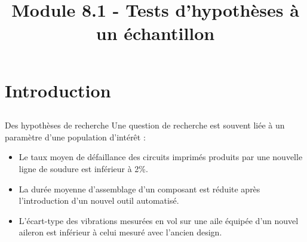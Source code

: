 \documentclass{BeamerTemplate}
\title{Module 8.1 - Tests d'hypothèses à un échantillon}
\begin{document}
\begin{frame}[t]
  \titlepage
\end{frame}







\section{Introduction}


\subsection*{ }

\begin{frame}[t]{Des hypothèses de recherche}
Une question de recherche est souvent liée à un paramètre d'une population d'intérêt :
\bigskip

\begin{itemize}\itemsep 5mm
\item Le taux moyen de défaillance des circuits imprimés produits par une nouvelle ligne de soudure est inférieur à 2\%.
\item La durée moyenne d’assemblage d’un composant est réduite après l’introduction d’un nouvel outil automatisé.
\item L’écart-type des vibrations mesurées en vol sur une aile équipée d’un nouvel aileron est inférieur à celui mesuré avec l’ancien design.
\end{itemize}
\end{frame}
\end{document}
